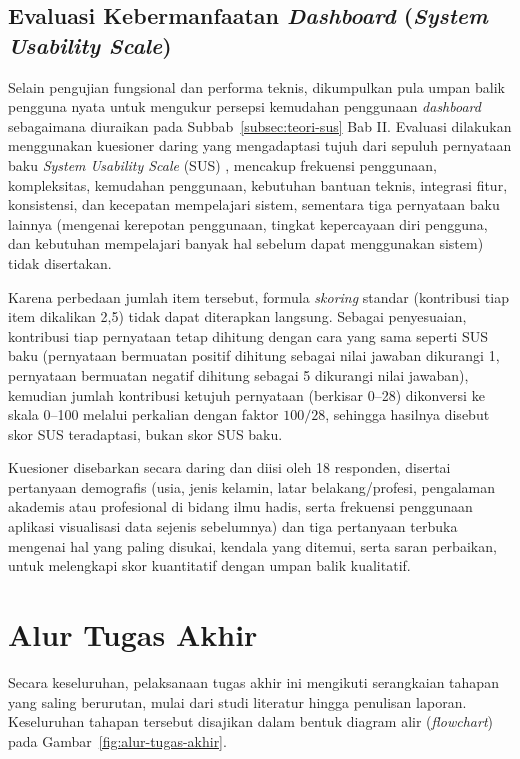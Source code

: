 \subsection{Evaluasi Kebermanfaatan \textit{Dashboard} (\textit{System Usability Scale})}
\label{subsec:metode-sus}
\begin{sloppypar}
Selain pengujian fungsional dan performa teknis, dikumpulkan pula umpan balik pengguna nyata untuk mengukur persepsi kemudahan penggunaan \textit{dashboard} sebagaimana diuraikan pada Subbab~\ref{subsec:teori-sus} Bab II. Evaluasi dilakukan menggunakan kuesioner daring yang mengadaptasi tujuh dari sepuluh pernyataan baku \textit{System Usability Scale} (SUS) \cite{Brooke1996}, mencakup frekuensi penggunaan, kompleksitas, kemudahan penggunaan, kebutuhan bantuan teknis, integrasi fitur, konsistensi, dan kecepatan mempelajari sistem, sementara tiga pernyataan baku lainnya (mengenai kerepotan penggunaan, tingkat kepercayaan diri pengguna, dan kebutuhan mempelajari banyak hal sebelum dapat menggunakan sistem) tidak disertakan.
\end{sloppypar}

Karena perbedaan jumlah item tersebut, formula \textit{skoring} standar (kontribusi tiap item dikalikan 2,5) tidak dapat diterapkan langsung. Sebagai penyesuaian, kontribusi tiap pernyataan tetap dihitung dengan cara yang sama seperti SUS baku (pernyataan bermuatan positif dihitung sebagai nilai jawaban dikurangi 1, pernyataan bermuatan negatif dihitung sebagai 5 dikurangi nilai jawaban), kemudian jumlah kontribusi ketujuh pernyataan (berkisar 0--28) dikonversi ke skala 0--100 melalui perkalian dengan faktor $100/28$, sehingga hasilnya disebut skor SUS teradaptasi, bukan skor SUS baku.

Kuesioner disebarkan secara daring dan diisi oleh 18 responden, disertai pertanyaan demografis (usia, jenis kelamin, latar belakang/profesi, pengalaman akademis atau profesional di bidang ilmu hadis, serta frekuensi penggunaan aplikasi visualisasi data sejenis sebelumnya) dan tiga pertanyaan terbuka mengenai hal yang paling disukai, kendala yang ditemui, serta saran perbaikan, untuk melengkapi skor kuantitatif dengan umpan balik kualitatif.

\section{Alur Tugas Akhir}

Secara keseluruhan, pelaksanaan tugas akhir ini mengikuti serangkaian tahapan yang saling berurutan, mulai dari studi literatur hingga penulisan laporan. Keseluruhan tahapan tersebut disajikan dalam bentuk diagram alir (\textit{flowchart}) pada Gambar~\ref{fig:alur-tugas-akhir}.

